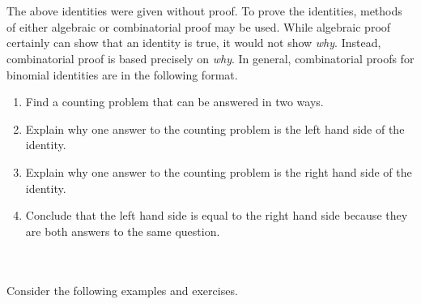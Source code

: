         \pagebreak
        \vphantom
        \\
        \\
        The above identities were given without proof. To prove the identities, methods of either algebraic or combinatorial proof may be used. While algebraic proof certainly can show that an identity is true, it would not show \textit{why}. Instead, combinatorial proof is based precisely on \textit{why}. In general, combinatorial proofs for binomial identities are in the following format.
        \begin{enumerate}
            \item Find a counting problem that can be answered in two ways.
            \item Explain why one answer to the counting problem is the left hand side of the identity.
            \item Explain why one answer to the counting problem is the right hand side of the identity.
            \item Conclude that the left hand side is equal to the right hand side because they are both answers to the same question.
        \end{enumerate}
        \vphantom
        \\
        \\
        Consider the following examples and exercises.
